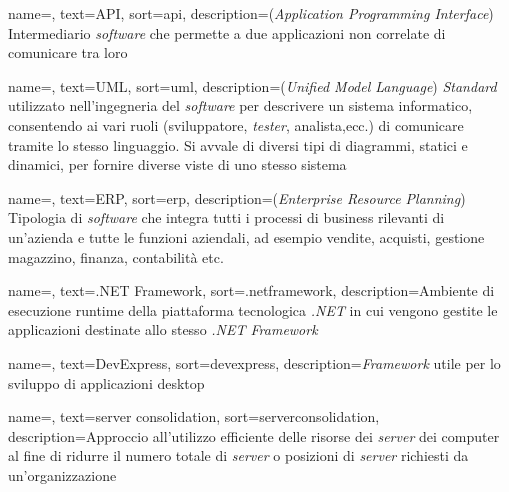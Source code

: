 
%

{
    name=,
    text=API,
    sort=api,
    description={(\emph{Application Programming Interface})
    Intermediario \textit{software} che permette a due
    applicazioni non correlate di comunicare tra loro}
}

{
    name=,
    text=UML,
    sort=uml,
    description={(\emph{Unified Model Language})
    \textit{Standard} utilizzato nell'ingegneria del \textit{software}
    per descrivere un sistema informatico, consentendo ai
    vari ruoli (sviluppatore, \textit{tester}, analista,ecc.) di
    comunicare tramite lo stesso linguaggio. Si avvale di
    diversi tipi di diagrammi, statici e dinamici,
    per fornire diverse viste di uno stesso sistema \cite{siteF:def-uml}}
}

{
    name=,
    text=ERP,
    sort=erp,
    description={(\emph{Enterprise Resource Planning})
    Tipologia di \textit{software} che integra tutti i processi
    di business rilevanti di un'azienda e tutte le funzioni
    aziendali, ad esempio vendite, acquisti, gestione magazzino,
    finanza, contabilità etc. \cite{siteE:wiki}}
}

{
    name=,
    text=.NET Framework,
    sort=.netframework,
    description={Ambiente di esecuzione runtime
    della piattaforma tecnologica \textit{.NET} in cui
    vengono gestite le applicazioni destinate allo stesso
    \textit{.NET Framework} \cite{siteE:wiki}}
}

{
    name=,
    text=DevExpress,
    sort=devexpress,
    description={\textit{Framework} utile per lo sviluppo
    di applicazioni desktop \cite{siteJ:devexpress-docs}}
}

{
    name=,
    text=server consolidation,
    sort=serverconsolidation,
    description={Approccio all'utilizzo efficiente
    delle risorse dei \textit{server} dei computer al fine di
    ridurre il numero totale di \textit{server} o posizioni di
    \textit{server} richiesti da un'organizzazione \cite{siteD:def-server-cons}}
}


